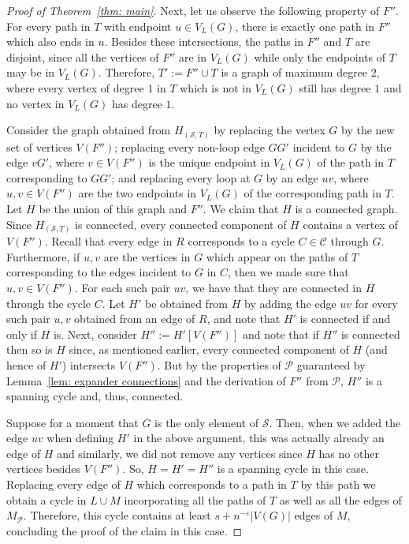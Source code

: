 \documentclass[11pt,reqno]{article}
\newenvironment{claimproof}[1][\proofname]{\proof[#1]\renewcommand{\qedsymbol}{$\blacksquare$}}{\endproof}
\begin{document}
\begin{proof}[Proof of Theorem~\ref{thm: main}]
\begin{claimproof}
    Next, let us observe the following property of $F''$. For every path in $T$ with endpoint $u\in V_L(G)$, there is exactly one path in $F''$ which also ends in $u$. Besides these intersections, the paths in $F''$ and $T$ are disjoint, since all the vertices of $F''$ are in $V_L(G)$ while only the endpoints of $T$ may be in $V_L(G)$. Therefore, $T':=F''\cup T$ is a graph of maximum degree $2$, where every vertex of degree $1$ in $T$ which is not in $V_L(G)$ still has degree $1$ and no vertex in $V_L(G)$ has degree $1$. 

    Consider the graph obtained from $H_{(\mathcal S,T)}$ by replacing the vertex $G$ by the new set of vertices $V(F'')$; replacing every non-loop edge $GG'$ incident to $G$ by the edge $vG'$, where $v\in V(F'')$ is the unique endpoint in $V_L(G)$ of the path in $T$ corresponding to $GG'$; and replacing every loop at $G$ by an edge $uv$, where $u,v\in V(F'')$ are the two endpoints in $V_L(G)$ of the corresponding path in $T$. Let $H$ be the union of this graph and $F''$. We claim that $H$ is a connected graph. Since $H_{(\mathcal S,T)}$ is connected, every connected component of $H$ contains a vertex of $V(F'')$. Recall that every edge in $R$ corresponds to a cycle $C\in \mathcal C$ through $G$. Furthermore, if $u,v$ are the vertices in $G$ which appear on the paths of $T$ corresponding to the edges incident to $G$ in $C$, then we made sure that $u,v\in V(F'')$. For each such pair $uv$, we have that they are connected in $H$ through the cycle $C$. Let $H'$ be obtained from $H$ by adding the edge $uv$ for every such pair $u,v$ obtained from an edge of $R$, and note that $H'$ is connected if and only if $H$ is. Next, consider $H'':=H'[V(F'')]$ and note that if $H''$ is connected then so is $H$ since, as mentioned earlier, every connected component of $H$ (and hence of $H'$) intersects $V(F'')$. But by the properties of $\mathcal P$ guaranteed by Lemma~\ref{lem: expander connections} and the derivation of $F''$ from $\mathcal P$, $H''$ is a spanning cycle and, thus, connected.

    Suppose for a moment that $G$ is the only element of $\mathcal S$. Then, when we added the edge $uv$ when defining $H'$ in the above argument, this was actually already an edge of $H$ and similarly, we did not remove any vertices since $H$ has no other vertices besides $V(F'')$. So, $H=H'=H''$ is a spanning cycle in this case. Replacing every edge of $H$ which corresponds to a path in $T$ by this path we obtain a cycle in $L\cup M$ incorporating all the paths of $T$ as well as all the edges of $M_{\mathcal P}$. Therefore, this cycle contains at least $s+n^{-\varepsilon}|V(G)|$ edges of $M$, concluding the proof of the claim in this case.


\end{claimproof}
\end{proof}
\end{document}
